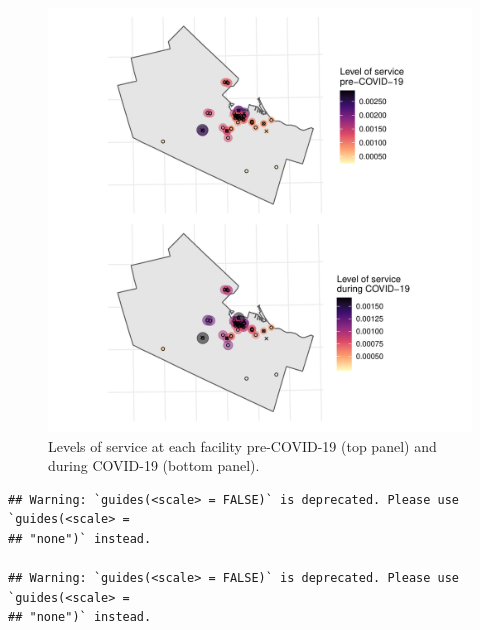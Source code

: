 \documentclass[]{elsarticle} %
\begin{document}
\begin{figure}
\includegraphics[width=1\linewidth]{Accessibility-Foodbanks-Hamilton-V0_files/figure-latex/plot-levels-of-service-1} \caption{\label{fig:levels-of-service}Levels of service at each facility pre-COVID-19 (top panel) and during COVID-19 (bottom panel).}\label{fig:plot-levels-of-service}
\end{figure}

\begin{verbatim}
## Warning: `guides(<scale> = FALSE)` is deprecated. Please use `guides(<scale> =
## "none")` instead.

## Warning: `guides(<scale> = FALSE)` is deprecated. Please use `guides(<scale> =
## "none")` instead.
\end{verbatim}
\end{document}
